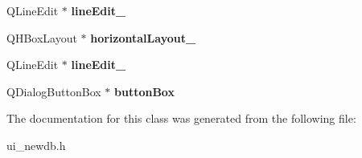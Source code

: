 \begin{DoxyCompactItemize}
\item 
\hypertarget{classUi__NewDB_ae8390e64d2d1853f230cefa070a1ac0f}{Q\-Line\-Edit $\ast$ {\bfseries line\-Edit\-\_}}\label{classUi__NewDB_ae8390e64d2d1853f230cefa070a1ac0f}

\item 
\hypertarget{classUi__NewDB_a82e635aa3dd0a99cec073c7ab3fa0200}{Q\-H\-Box\-Layout $\ast$ {\bfseries horizontal\-Layout\-\_}}\label{classUi__NewDB_a82e635aa3dd0a99cec073c7ab3fa0200}

\item 
\hypertarget{classUi__NewDB_a8d4a8cc4028132a3621d085b162f356e}{Q\-Line\-Edit $\ast$ {\bfseries line\-Edit\-\_}}\label{classUi__NewDB_a8d4a8cc4028132a3621d085b162f356e}

\item 
\hypertarget{classUi__NewDB_a26adf2500c8747bdf47f25f8318ce7a0}{Q\-Dialog\-Button\-Box $\ast$ {\bfseries button\-Box}}\label{classUi__NewDB_a26adf2500c8747bdf47f25f8318ce7a0}

\end{DoxyCompactItemize}


The documentation for this class was generated from the following file\-:\begin{DoxyCompactItemize}
\item 
ui\-\_\-newdb.\-h\end{DoxyCompactItemize}
